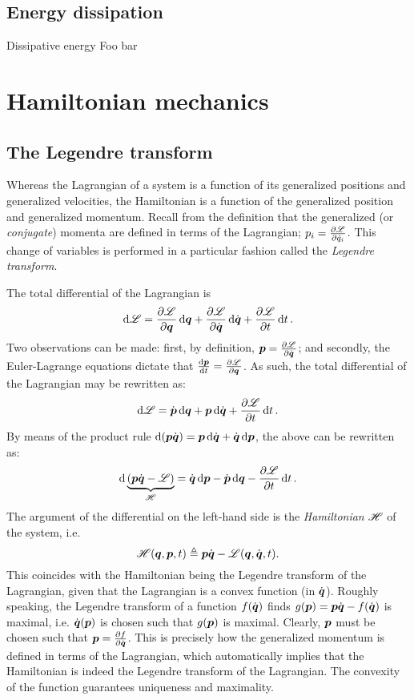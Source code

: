 \subsection{Energy dissipation}
\begin{econ}{Dissipative energy}
    Foo bar
\end{econ}

\section{Hamiltonian mechanics}

\subsection{The Legendre transform}
Whereas the Lagrangian of a system is a function of its generalized positions and generalized velocities, the Hamiltonian is a function of the generalized position and generalized momentum. Recall from the definition that the generalized (or \emph{conjugate}) momenta are defined in terms of the Lagrangian; $p_i = \pdv{\ensuremath{\mathscr{L}}}{\dot{q}_i}$. This change of variables is performed in a particular fashion called the \emph{Legendre transform}.

The total differential of the Lagrangian is
$$ \dd{\ensuremath{\mathscr{L}}} = \pdv{\ensuremath{\mathscr{L}}}{\ensuremath{\vb*{q}}}\dd{\ensuremath{\vb*{q}}} + \pdv{\ensuremath{\mathscr{L}}}{\ensuremath{\dot{\vb*{q}}}}\dd{\ensuremath{\dot{\vb*{q}}}} + \pdv{\ensuremath{\mathscr{L}}}{t}\dd{t}. $$
Two observations can be made: first, by definition, $\vb*{p} = \pdv{\ensuremath{\mathscr{L}}}{\ensuremath{\dot{\vb*{q}}}}$; and secondly, the Euler-Lagrange equations dictate that $\dv{\ensuremath{\vb*{p}}}{t} = \pdv{\ensuremath{\mathscr{L}}}{\ensuremath{\vb*{q}}}$. As such, the total differential of the Lagrangian may be rewritten as: \cite{Landau1960}
$$ \dd{\ensuremath{\mathscr{L}}} = \dot{\vb*{p}}\dd{\ensuremath{\vb*{q}}} + \vb*{p} \dd{\ensuremath{\dot{\vb*{q}}}} + \pdv{\ensuremath{\mathscr{L}}}{t}\dd{t}.$$
By means of the product rule $\dd{(\gmom \gvel)} = \gmom\dd{\gvel} + \gvel\dd{\gmom}$, the above can be rewritten as: 
\begin{equation}
    \dd{\underbrace{(\gmom\gvel - \lag)}_{\ham}} = \gvel\dd{\gmom} - \dot{\gmom}\dd{\gpos} - \pdv{\lag}{t}\dd{t}.
    \label{eq:diff_hamiltonian}
\end{equation}
The argument of the differential on the left-hand side is the \emph{Hamiltonian} $\mathscr{H}$ of the system, i.e. 
$$ \mathscr{H}(\vb*{q}, \vb*{p}, t) \triangleq \vb*{p} \dot{\vb*{q}} - \mathscr{L}(\vb*{q}, \dot{\vb*{q}}, t). $$
This coincides with the Hamiltonian being the Legendre transform of the Lagrangian, given that the Lagrangian is a convex function (in $\dot{\vb*{q}}$). Roughly speaking, the Legendre transform of a function $f(\dot{\vb*{q}})$ finds $g(\vb*{p}) = \vb*{p}\dot{\vb*{q}} - f(\dot{\vb*{q}})$ is maximal, i.e. $\dot{\vb*{q}}(\vb*{p})$ is chosen such that $g(\vb*{p})$ is maximal. Clearly, $\vb*{p}$ must be chosen such that $\vb*{p} = \pdv{f}{\ensuremath{\dot{\vb*{q}}}}$. This is precisely how the generalized momentum is defined in terms of the Lagrangian, which automatically implies that the Hamiltonian is indeed the Legendre transform of the Lagrangian. The convexity of the function guarantees uniqueness and maximality.

